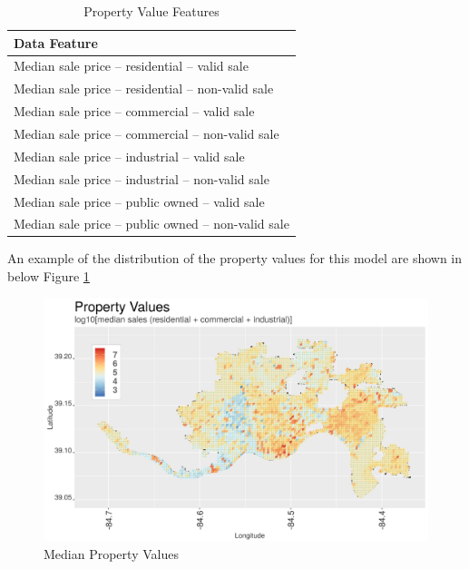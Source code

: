 \documentclass{llncs}
\begin{document}

\FloatBarrier
\begin{table}[!h]
\begin{center}
\caption{Property Value Features}
\label{table : propertyValueFeatures}
\begin{tabular}{ p{}}
\hline
\rule{0pt}{12pt}
Data Feature	\\
\hline
Median sale price – residential – valid sale\\
Median sale price – residential – non-valid sale\\
Median sale price – commercial – valid sale\\
Median sale price – commercial – non-valid sale\\
Median sale price – industrial – valid sale\\
Median sale price – industrial – non-valid sale\\
Median sale price – public owned – valid sale\\
Median sale price – public owned – non-valid sale \\[2pt]
\hline
\end{tabular}
\end{center}
\end{table}
\FloatBarrier
%

An example of the distribution of the property values for this model are shown in below Figure \ref{figure : medianpropertyvalues}

\FloatBarrier
\begin{figure}
 	\includegraphics[width=\textwidth, height=\textheight, keepaspectratio]{propertyValuesMedianAllY}
 	\caption{Median Property Values}
	\label{figure : medianpropertyvalues}
\end{figure}
\FloatBarrier
\end{document}
